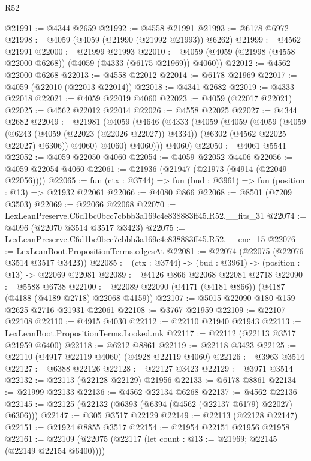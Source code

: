 \begin{lexlean}{R52}
\begin{coremodule}
@21991 := @4344 @2659
@21992 := @4558 @21991
@21993 := @6178 @6972
@21998 := @4059 (@4059 (@21990 (@21992 @21993)) @6262)
@21999 := @4562 @21991
@22000 := @21999 @21993
@22010 := @4059 (@4059 (@21998 (@4558 @22000 @6268)) (@4059 (@4333 (@6175 @21969)) @4060))
@22012 := @4562 @22000 @6268
@22013 := @4558 @22012
@22014 := @6178 @21969
@22017 := @4059 (@22010 (@22013 @22014))
@22018 := @4341 @2682
@22019 := @4333 @22018
@22021 := @4059 @22019 @4060
@22023 := @4059 (@22017 @22021)
@22025 := @4562 @22012 @22014
@22026 := @4558 @22025
@22027 := @4344 @2682
@22049 := @21981
    (@4059
      (@4646
        (@4333
          (@4059
            (@4059
              (@4059
                (@4059
                  (@6243 (@4059 (@22023 (@22026 @22027)) @4334))
                  (@6302 (@4562 @22025 @22027) @6306))
                @4060)
              @4060)
            @4060)))
      @4060)
@22050 := @4061 @5541
@22052 := @4059 @22050 @4060
@22054 := @4059 @22052 @4406
@22056 := @4059 @22054 @4060
@22061 := @21936 (@21947 (@21973 (@4914 (@22049 @22056))))
@22065 := fun (ctx : @3744) => fun (bud : @3961) => fun (position : @13) => @21932 @22061
@22066 := @4080 @866
@22068 := @8501 (@7209 @3503)
@22069 := @22066 @22068
@22070 := LexLeanPreserve.C6d1bc0bcc7cbbb3a169c4e838883ff45.R52.__fits_31
@22074 := @4096 (@22070 @3514 @3517 @3423)
@22075 := LexLeanPreserve.C6d1bc0bcc7cbbb3a169c4e838883ff45.R52.__enc_15
@22076 := LexLeanBoot.PropositionTerms.edgesAt
@22081 := @22074 (@22075 (@22076 @3514 @3517 @3423))
@22085 := (ctx : @3744) -> (bud : @3961) -> (position : @13) -> @22069 @22081
@22089 := @4126 @866 @22068 @22081 @2718
@22090 := @5588 @6738
@22100 := @22089 @22090 (@4171 (@4181 @866)) (@4187 (@4188 (@4189 @2718) @22068 @4159))
@22107 := @5015 @22090 @180 @159 @2625 @2716 @21931 @22061
@22108 := @3767 @21959
@22109 := @22107 @22108
@22110 := @4915 @4030
@22112 := @22110 @21940 @21943
@22113 := LexLeanBoot.PropositionTerms.Looked.mk
@22117 := @22112 (@22113 @3517 @21959 @6400)
@22118 := @6212 @8861
@22119 := @22118 @3423
@22125 := @22110 (@4917 @22119 @4060) (@4928 @22119 @4060)
@22126 := @3963 @3514
@22127 := @6388 @22126
@22128 := @22127 @3423
@22129 := @3971 @3514
@22132 := @22113 (@22128 @22129) @21956
@22133 := @6178 @8861
@22134 := @21999 @22133
@22136 := @4562 @22134 @6268
@22137 := @4562 @22136
@22145 := @22125 (@22132 (@6393 (@6394 (@4562 (@22137 @6179) @22027) @6306)))
@22147 := @305 @3517 @22129
@22149 := @22113 (@22128 @22147)
@22151 := @21924 @8855 @3517
@22154 := @21954 @22151 @21956 @21958
@22161 := @22109 (@22075 (@22117 (let count : @13 := @21969; @22145 (@22149 @22154 @6400))))

\end{coremodule}
\end{lexlean}
